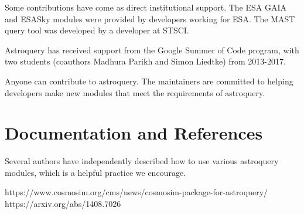 \documentclass{article}
\begin{document}
Some contributions have come as direct institutional support.  The ESA GAIA and
ESASky modules were provided by developers working for ESA.  The MAST query
tool was developed by a developer at STSCI. 

Astroquery has received support from the Google Summer of Code
program, with two students (coauthors Madhura Parikh and Simon Liedtke)
from 2013-2017.

Anyone can contribute to astroquery.  The maintainers are committed to helping
developers make new modules that meet the requirements of astroquery.

\section{Documentation and References}
Several authors have independently described how to use various astroquery
modules, which is a helpful practice we encourage.

https://www.cosmosim.org/cms/news/cosmosim-package-for-astroquery/
https://arxiv.org/abs/1408.7026
\end{document}
